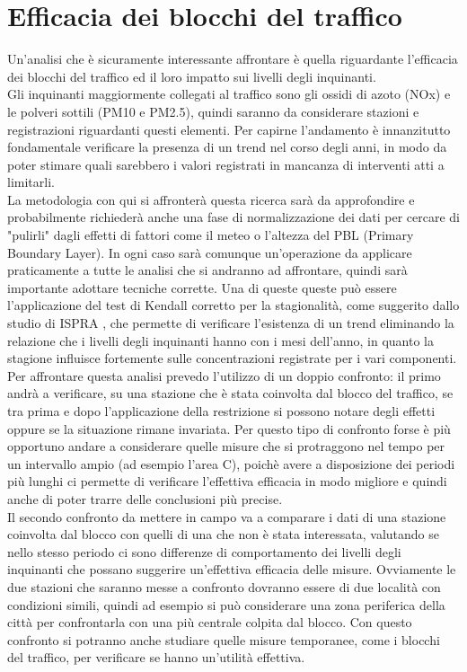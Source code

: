 \documentclass{article}
\begin{document}
\section{Efficacia dei blocchi del traffico}
Un'analisi che è sicuramente interessante affrontare è quella riguardante l'efficacia dei blocchi del traffico ed il loro impatto sui livelli degli inquinanti. 
\\Gli inquinanti maggiormente collegati al traffico sono gli ossidi di azoto (NOx) e le polveri sottili (PM10 e PM2.5), quindi saranno da considerare stazioni e registrazioni riguardanti questi elementi.
Per capirne l'andamento è innanzitutto fondamentale verificare la presenza di un trend nel corso degli anni, in modo da poter stimare quali sarebbero i valori registrati in mancanza di interventi atti a limitarli. 
\\La metodologia con qui si affronterà questa ricerca sarà da approfondire e probabilmente richiederà anche una fase di normalizzazione dei dati per cercare di "pulirli" dagli effetti di fattori come il meteo o l'altezza del PBL (Primary Boundary Layer). In ogni caso sarà comunque un'operazione da applicare praticamente a tutte le analisi che si andranno ad affrontare, quindi sarà importante adottare tecniche corrette. Una di queste queste può essere l'applicazione del test di Kendall corretto per la stagionalità, come suggerito dallo studio di ISPRA \cite{cattani2014analisi}, che permette di verificare l'esistenza di un trend eliminando la relazione che i livelli degli inquinanti hanno con i mesi dell'anno, in quanto la stagione influisce fortemente sulle concentrazioni registrate per i vari componenti.  
\\Per affrontare questa analisi prevedo l'utilizzo di un doppio confronto: il primo andrà a verificare, su una stazione che è stata coinvolta dal blocco del traffico, se tra prima e dopo l'applicazione della restrizione si possono notare degli effetti oppure se la situazione rimane invariata. Per questo tipo di confronto forse è più opportuno andare a considerare quelle misure che si protraggono nel tempo per un intervallo ampio (ad esempio l'area C), poichè avere a disposizione dei periodi più lunghi ci permette di verificare l'effettiva efficacia in modo migliore e quindi anche di poter trarre delle conclusioni più precise.
\\Il secondo confronto da mettere in campo va a comparare i dati di una stazione coinvolta dal blocco con quelli di una che non è stata interessata, valutando se nello stesso periodo ci sono differenze di comportamento dei livelli degli inquinanti che possano suggerire un'effettiva efficacia delle misure. Ovviamente le due stazioni che saranno messe a confronto dovranno essere di due località con condizioni simili, quindi ad esempio si può considerare una zona periferica della città per confrontarla con una più centrale colpita dal blocco. Con questo confronto si potranno anche studiare quelle misure temporanee, come i blocchi del traffico, per verificare se hanno un'utilità effettiva.
\end{document}
